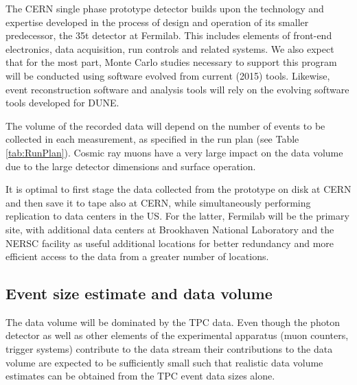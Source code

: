 \label{computing}

The CERN single phase prototype detector builds upon the technology and expertise developed in the
process of design and operation of its smaller predecessor, the 35t detector at Fermilab.
This includes elements of front-end electronics, data acquisition, run controls and related systems. We also expect that for the most part, Monte Carlo studies necessary to support this program will be conducted using software evolved from current (2015) tools. Likewise,
event reconstruction software and analysis tools will rely on the evolving software tools developed for DUNE.

The volume of the recorded data will depend on the number of events to be collected in each measurement,
as specified in the run plan (see Table \ref{tab:RunPlan}).  Cosmic ray muons have a very large impact on the data volume due to the large detector dimensions and surface operation.

It is optimal to first stage the data collected from the prototype on disk at CERN and then save it to tape also at CERN,
while simultaneously performing replication to data centers in the US. For the latter, Fermilab will be the primary site, with additional data centers at Brookhaven National Laboratory and the NERSC facility as useful additional locations for better redundancy and more efficient access to the data from a greater number of locations.



\subsection{Event size estimate and data volume}

The data volume will be dominated by the TPC data. Even though the photon detector as well as other elements of the experimental apparatus (muon counters, trigger systems) contribute to the data stream their contributions to the data volume are expected to be sufficiently small such that realistic data volume estimates can be obtained from the TPC event data sizes alone.

